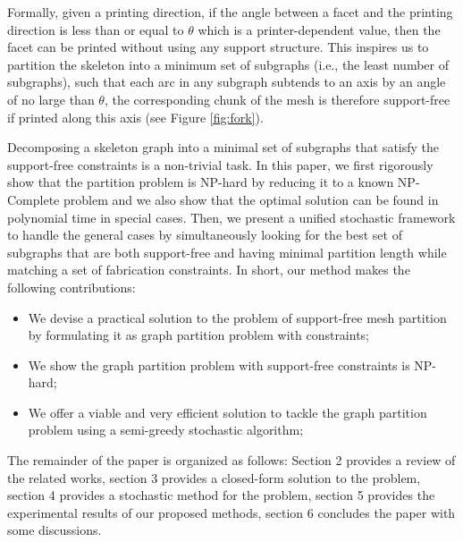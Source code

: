 Formally, given a printing direction, if the angle between a facet and the printing direction is less than or equal to $\theta$ which is a printer-dependent value, then the facet can be printed without using any support structure. This inspires us to partition the skeleton into a minimum set of subgraphs (i.e., the least number of subgraphs), such that each arc in any subgraph subtends to an axis by an angle of no large than $\theta$, the corresponding chunk of the mesh is therefore support-free if printed along this axis (see Figure \ref{fig:fork}). %


{Decomposing a skeleton graph into a minimal set of subgraphs that satisfy the support-free constraints is a non-trivial task. In this paper, we first rigorously show that the partition problem is NP-hard by reducing it to a known NP-Complete problem and we also show that the optimal solution can be found in polynomial time in {special} cases. Then, we present a unified stochastic framework to handle the general cases by simultaneously looking for} the best set of subgraphs that are both support-free and having minimal partition length while matching a set of fabrication constraints. In short, our method makes the following contributions:

{
\begin{itemize}
\item {We devise a practical solution to the problem of support-free mesh partition by formulating it as graph partition problem with constraints;}
\item {We show the graph partition problem with support-free constraints is NP-hard;}
\item {We offer a viable and very efficient solution to tackle the graph partition problem using a semi-greedy stochastic algorithm;}
\end{itemize}
}
{The remainder of the paper is organized as follows: Section 2 provides a review of the related works, section 3 provides a closed-form solution to the problem, section 4 provides a stochastic method for the problem, section 5 provides the experimental results of our proposed methods, section 6 concludes the paper with some discussions.}
